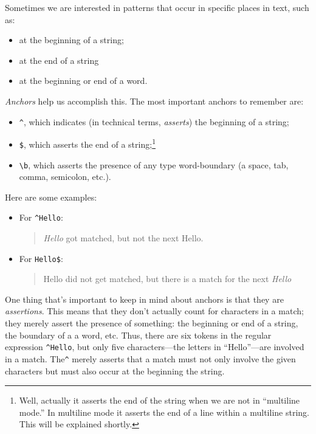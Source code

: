 \documentclass[]{book}
\providecommand{\tightlist}{%
  \setlength{\itemsep}{0pt}\setlength{\parskip}{0pt}}
\let\rmarkdownfootnote\footnote%
\def\footnote{\protect\rmarkdownfootnote}
\theoremstyle{definition}
\theoremstyle{definition}
\theoremstyle{definition}
\theoremstyle{remark}
\begin{document}
{Sometimes we are interested in patterns that occur in specific places in
text, such as:

\begin{itemize}
\tightlist
\item
  at the beginning of a string;
\item
  at the end of a string
\item
  at the beginning or end of a word.
\end{itemize}

\emph{Anchors} help us accomplish this. The most important
anchors to remember are:

\begin{itemize}
\tightlist
\item
  \texttt{\^{}}, which indicates (in technical terms, \emph{asserts})
  the beginning of a string;
\item
  \texttt{\$}, which asserts the end of a string;\footnote{Well,
    actually it asserts the end of the string when we are not in
    ``multiline mode.'' In multiline mode it asserts the end of a line
    within a multiline string. This will be explained shortly.}
\item
  \texttt{\textbackslash{}b}, which asserts the presence of any type
  word-boundary (a space, tab, comma, semicolon, etc.).
\end{itemize}

Here are some examples:

\begin{itemize}
\item
  For \texttt{\^{}Hello}:

  \begin{quote}
  \emph{Hello} got matched, but not the next Hello.
  \end{quote}
\item
  For \texttt{Hello\$}:

  \begin{quote}
  Hello did not get matched, but there is a match for the next
  \emph{Hello}
  \end{quote}
\end{itemize}

One thing that's important to keep in mind about anchors is that they
are \emph{assertions}. This means that they don't
actually count for characters in a match; they merely assert the
presence of something: the beginning or end of a string, the boundary of
a a word, etc. Thus, there are six tokens in the regular expression
\texttt{\^{}Hello}, but only five characters---the letters in
``Hello''---are involved in a match. The\texttt{\^{}} merely asserts
that a match must not only involve the given characters but must also
occur at the beginning the string.

}
\end{document}
